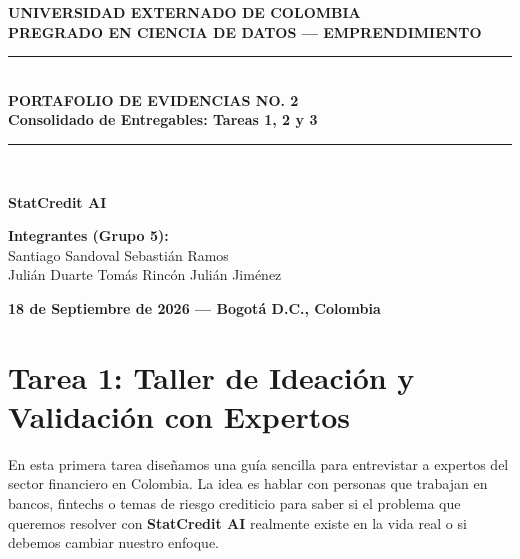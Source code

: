 \documentclass[11pt,a4paper]{article}
\begin{document}
\begin{titlepage}
    \centering
    \vspace*{1cm}
    {\Huge \textbf{UNIVERSIDAD EXTERNADO DE COLOMBIA}}\\[0.4cm]
    {\Large \textbf{PREGRADO EN CIENCIA DE DATOS --- EMPRENDIMIENTO}}\\[1.8cm]
    
    \rule{\linewidth}{0.8mm}\\[0.4cm]
    {\Huge \textbf{PORTAFOLIO DE EVIDENCIAS NO. 2}}\\[0.3cm]
    {\Large \textbf{Consolidado de Entregables: Tareas 1, 2 y 3}}\\[0.4cm]
    \rule{\linewidth}{0.8mm}\\[1.8cm]
    
    \begin{tcolorbox}[colback=primary!5,colframe=primary]
        \centering \Huge
        \textbf{StatCredit AI}
    \end{tcolorbox}
    
    \vfill
    
    \begin{minipage}{0.8\textwidth}
        \centering
        \textbf{\large Integrantes (Grupo 5):}\\[0.3cm]
        Santiago Sandoval \quad\vert\quad Sebastián Ramos\\[0.15cm]
        Julián Duarte \quad\vert\quad Tomás Rincón \quad\vert\quad Julián Jiménez
    \end{minipage}
    
    \vfill
    {\large \textbf{18 de Septiembre de 2026 --- Bogotá D.C., Colombia}}
\end{titlepage}

\newpage
\tableofcontents
\newpage

\section{Tarea 1: Taller de Ideación y Validación con Expertos}

\begin{tcolorbox}[colback=primary!5,colframe=primary,title=\textbf{¿De qué trata este entregable?}]
En esta primera tarea diseñamos una guía sencilla para entrevistar a expertos del sector financiero en Colombia. La idea es hablar con personas que trabajan en bancos, fintechs o temas de riesgo crediticio para saber si el problema que queremos resolver con \textbf{StatCredit AI} realmente existe en la vida real o si debemos cambiar nuestro enfoque.
\end{tcolorbox}
\end{document}
